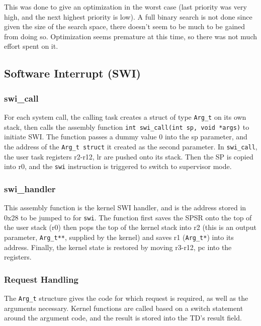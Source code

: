 \documentclass[12pt]{article}
\begin{document}
This was done to give an optimization in the worst case (last priority was very high, and the next highest priority is low). A full binary search is not done since given the size of the search space, there doesn’t seem to be much to be gained from doing so. Optimization seems premature at this time, so there was not much effort spent on it.
\\[1\baselineskip]
\subsection{Software Interrupt (SWI)}
\subsubsection{swi\_call}
For each system call, the calling task creates a struct of type \texttt{Arg\_t} on its own stack, then calls the assembly function \texttt{int swi\_call(int sp, void *args)} to initiate SWI. The function passes a dummy value $0$ into the sp parameter, and the address of the \texttt{Arg\_t struct} it created as the second parameter.  In \texttt{swi\_call}, the user task registers {r2-r12, lr} are pushed onto its stack. Then the SP is copied into r0, and the \texttt{swi} instruction is triggered to switch to supervisor mode.
\\[1\baselineskip]
\subsubsection{swi\_handler}
This assembly function is the kernel SWI handler, and is the address stored in 0x28 to be jumped to for \texttt{swi}. The function first saves the SPSR onto the top of the user stack (r0) then pops the top of the kernel stack into r2 (this is an output parameter, \texttt{Arg\_t**}, supplied by the kernel) and saves r1 (\texttt{Arg\_t*}) into its address. Finally, the kernel state is restored by moving {r3-r12, pc} into the registers.
\\[1\baselineskip]
\subsubsection{Request Handling}
The \texttt{Arg\_t} structure gives the code for which request is required, as well as the arguments necessary. Kernel functions are called based on a switch statement around the argument code, and the result is stored into the TD’s result field.
\\[1\baselineskip]
\end{document}
